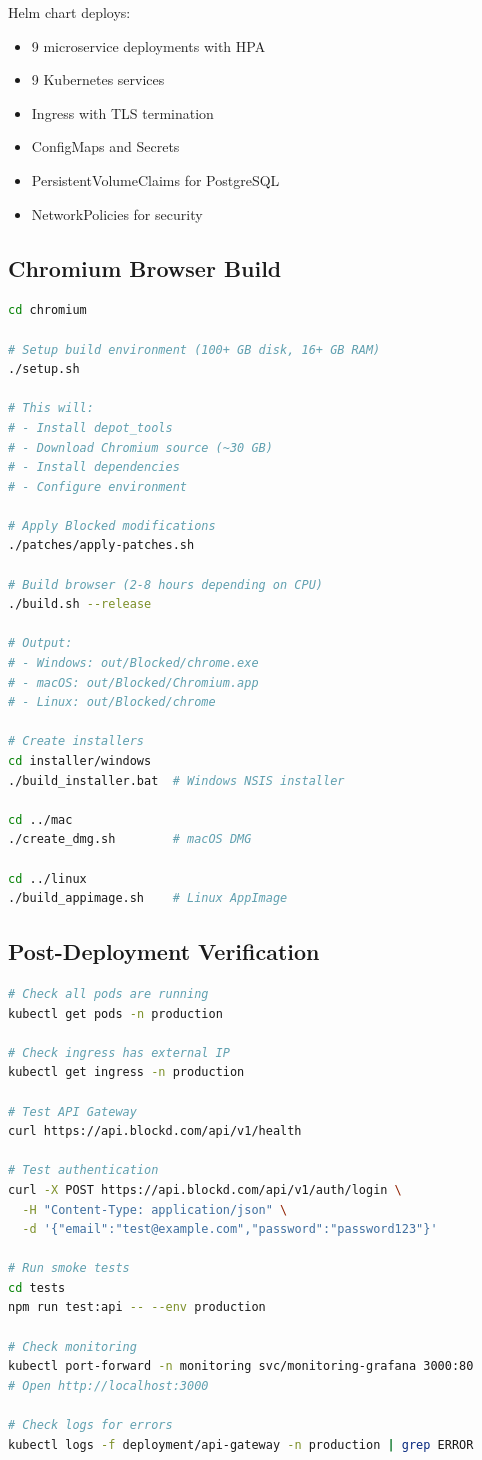 \documentclass[11pt,letterpaper]{article}
\begin{document}
Helm chart deploys:
\begin{itemize}[noitemsep]
    \item 9 microservice deployments with HPA
    \item 9 Kubernetes services
    \item Ingress with TLS termination
    \item ConfigMaps and Secrets
    \item PersistentVolumeClaims for PostgreSQL
    \item NetworkPolicies for security
\end{itemize}

\subsection{Chromium Browser Build}

\begin{lstlisting}[language=bash, caption=Build Blocked Browser]
cd chromium

# Setup build environment (100+ GB disk, 16+ GB RAM)
./setup.sh

# This will:
# - Install depot_tools
# - Download Chromium source (~30 GB)
# - Install dependencies
# - Configure environment

# Apply Blocked modifications
./patches/apply-patches.sh

# Build browser (2-8 hours depending on CPU)
./build.sh --release

# Output:
# - Windows: out/Blocked/chrome.exe
# - macOS: out/Blocked/Chromium.app
# - Linux: out/Blocked/chrome

# Create installers
cd installer/windows
./build_installer.bat  # Windows NSIS installer

cd ../mac
./create_dmg.sh        # macOS DMG

cd ../linux
./build_appimage.sh    # Linux AppImage
\end{lstlisting}

\subsection{Post-Deployment Verification}

\begin{lstlisting}[language=bash, caption=Verification Checklist]
# Check all pods are running
kubectl get pods -n production

# Check ingress has external IP
kubectl get ingress -n production

# Test API Gateway
curl https://api.blockd.com/api/v1/health

# Test authentication
curl -X POST https://api.blockd.com/api/v1/auth/login \
  -H "Content-Type: application/json" \
  -d '{"email":"test@example.com","password":"password123"}'

# Run smoke tests
cd tests
npm run test:api -- --env production

# Check monitoring
kubectl port-forward -n monitoring svc/monitoring-grafana 3000:80
# Open http://localhost:3000

# Check logs for errors
kubectl logs -f deployment/api-gateway -n production | grep ERROR
\end{lstlisting}
\end{document}
